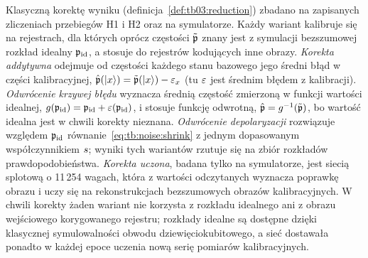 
Klasyczną korektę wyniku (definicja~\ref{def:tb03:reduction}) zbadano na zapisanych zliczeniach przebiegów H1 i H2 oraz na symulatorze.
Każdy wariant kalibruje się na rejestrach, dla których oprócz częstości $\tilde{\mathfrak{p}}$ znany jest z symulacji bezszumowej rozkład idealny $\mathfrak{p}_{\mathrm{id}}$, a stosuje do rejestrów kodujących inne obrazy.
\emph{Korekta addytywna} odejmuje od częstości każdego stanu bazowego jego średni błąd w części kalibracyjnej, $\hat{\mathfrak{p}}(\ket{x})=\tilde{\mathfrak{p}}(\ket{x})-\varepsilon_x$ (tu $\varepsilon$ jest średnim błędem z kalibracji).
\emph{Odwrócenie krzywej błędu} wyznacza średnią częstość zmierzoną w funkcji wartości idealnej, $g(\mathfrak{p}_{\mathrm{id}})=\mathfrak{p}_{\mathrm{id}}+\varepsilon(\mathfrak{p}_{\mathrm{id}})$, i stosuje funkcję odwrotną, $\hat{\mathfrak{p}}=g^{-1}(\tilde{\mathfrak{p}})$, bo wartość idealna jest w chwili korekty nieznana.
\emph{Odwrócenie depolaryzacji} rozwiązuje względem $\mathfrak{p}_{\mathrm{id}}$ równanie~\eqref{eq:tb:noise:shrink} z jednym dopasowanym współczynnikiem $s$; wyniki tych wariantów rzutuje się na zbiór rozkładów prawdopodobieństwa.
\emph{Korekta uczona}, badana tylko na symulatorze, jest siecią splotową o 11\,254 wagach, która z wartości odczytanych wyznacza poprawkę obrazu i uczy się na rekonstrukcjach bezszumowych obrazów kalibracyjnych.
W chwili korekty żaden wariant nie korzysta z rozkładu idealnego ani z obrazu wejściowego korygowanego rejestru; rozkłady idealne są dostępne dzięki klasycznej symulowalności obwodu dziewięciokubitowego, a sieć dostawała ponadto w każdej epoce uczenia nową serię pomiarów kalibracyjnych.

